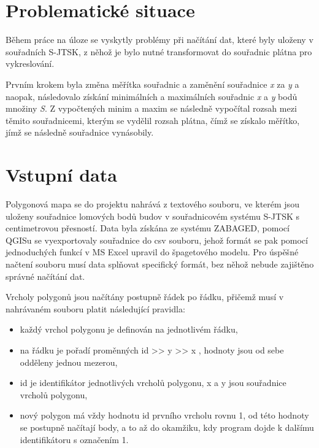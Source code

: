 \documentclass[11pt]{article}
\begin{document}
		\section{Problematické situace}
		Během práce na úloze se vyskytly problémy při načítání dat, které byly uloženy v souřadních S-JTSK, z něhož je bylo nutné transformovat do souřadnic plátna pro vykreslování. 
		
		Prvním krokem byla změna měřítka souřadnic a zaměnění souřadnice \textit{x} za \textit{y} a naopak, následovalo získání minimálních a maximálních souřadnic \textit{x} a \textit{y} bodů množiny \textit{S}. Z vypočtených minim a maxim se následně vypočítal rozsah mezi těmito souřadnicemi, kterým se vydělil rozsah plátna, čímž se získalo měřítko, jímž se následně souřadnice vynásobily.
		
		
		
		
		\section{Vstupní data}
		Polygonová mapa se do projektu nahrává z textového souboru, ve kterém jsou uloženy souřadnice lomových bodů budov v souřadnicovém systému S-JTSK s centimetrovou přesností. Data byla získána ze systému ZABAGED, pomocí QGISu se vyexportovaly souřadnice do csv souboru, jehož formát se pak pomocí jednoduchých funkcí v MS Excel upravil do špagetového modelu. Pro úspěšné načtení souboru musí data splňovat specifický formát, bez něhož nebude zajištěno správné načítání dat.  
		
		Vrcholy polygonů jsou načítány postupně řádek po řádku, přičemž musí v nahrávaném souboru platit následující pravidla:    
		
		\begin{itemize}
			\item každý vrchol polygonu je definován na jednotlivém řádku,
			\item na řádku je pořadí proměnných id >> y >> x   ,  hodnoty jsou od sebe odděleny  jednou mezerou,
			\item id je identifikátor jednotlivých vrcholů polygonu, x a y jsou souřadnice vrcholů polygonu,    
			\item nový polygon má vždy hodnotu id prvního vrcholu rovnu 1, od této hodnoty  se  postupně načítají body, a  to až do okamžiku,  kdy program dojde  k dalšímu identifikátoru s označením 1.   
		\end{itemize}
		
\end{document}
